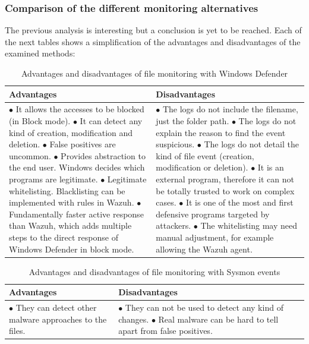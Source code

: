 \subsubsection{Comparison of the different monitoring alternatives}
The previous analysis is interesting but a conclusion is yet to be reached.
Each of the next tables shows a simplification of the advantages and disadvantages of the examined methods:
\begin{table}[H]
	\begin{tabularx}{\textwidth}{|w|w|}
		\hline
		Advantages & Disadvantages\\ \hline
			$\bullet$ It allows the accesses to be blocked (in Block mode).
			\linej $\bullet$ It can detect any kind of creation, modification and deletion.
			\linej $\bullet$ False positives are uncommon.
			\linej $\bullet$ Provides abstraction to the end user. Windows decides which programs are legitimate.
			\linej $\bullet$ Legitimate whitelisting. Blacklisting can be implemented with rules in Wazuh.
			\linej $\bullet$ Fundamentally faster active response than Wazuh, which adds multiple steps to the direct response of Windows Defender in block mode.
		&
			$\bullet$ The logs do not include the filename, just the folder path.
			\linej $\bullet$ The logs do not explain the reason to find the event suspicious.
			\linej $\bullet$ The logs do not detail the kind of file event (creation, modification or deletion).
			\linej $\bullet$ It is an external program, therefore it can not be totally trusted to work on complex cases.
			\linej $\bullet$ It is one of the most and first defensive programs targeted by attackers.
			\linej $\bullet$ The whitelisting may need manual adjustment, for example allowing the Wazuh agent.
			\\ \hline
	\end{tabularx}
	\caption{Advantages and disadvantages of file monitoring with Windows Defender}
\end{table}

\begin{table}[H]
	\begin{tabularx}{\textwidth}{|w|w|}
		\hline
		Advantages & Disadvantages\\ \hline
			$\bullet$ They can detect other malware approaches to the files.
		&
			$\bullet$ They can not be used to detect any kind of changes.
			\linej $\bullet$ Real malware can be hard to tell apart from false positives.
			\\ \hline
	\end{tabularx}
	\caption{Advantages and disadvantages of file monitoring with Sysmon events}
\end{table}

